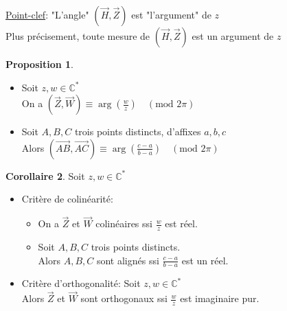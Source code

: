 \documentclass[10pt,a4paper]{article}
\theoremstyle{definition}
\newtheorem{proposition}{Proposition}[section]
\newtheorem{corollaire}[proposition]{Corollaire}
\begin{document}
\noindent \uline{Point-clef}: "L'angle" $(\vec{H}, \vec{Z})$ est "l'argument" de $z$ \\
Plus précisement, toute mesure de $(\vec{H}, \vec{Z})$ est un argument de $z$
\begin{proposition}
\hfill
\begin{itemize}
\item Soit $z, w \in \mathbb{C}^*$ \\
On a $(\vec{Z}, \vec{W}) \equiv \arg\left(\frac{w}{z}\right) \quad (\text{mod }2\pi)$
\item Soit $A, B, C$ trois points distincts, d'affixes $a, b, c$ \\
Alors $(\vec{AB}, \vec{AC}) \equiv \arg\left(\frac{c - a}{b - a}\right) \quad (\text{mod }2\pi)$
\end{itemize}
\end{proposition}
\begin{corollaire}
Soit $z, w \in \mathbb{C}^*$
\begin{itemize}
\item Critère de colinéarité:
\begin{itemize}
\item On a $\vec{Z}$ et $\vec{W}$ colinéaires ssi $\frac{w}{z}$ est réel.
\item Soit $A, B, C$ trois points distincts. \\
Alors $A, B, C$ sont alignés ssi $\frac{c - a}{b - a}$ est un réel.
\end{itemize}
\item Critère d'orthogonalité: Soit $z, w \in \mathbb{C}^*$ \\
Alors $\vec{Z}$ et $\vec{W}$ sont orthogonaux ssi $\frac{w}{z}$ est imaginaire pur.
\end{itemize}
\end{corollaire}
\end{document}
